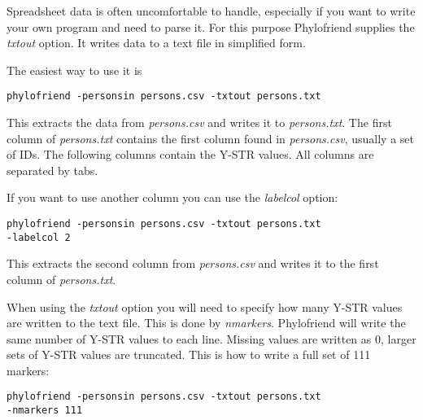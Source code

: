Spreadsheet data is often uncomfortable to handle, especially
if you want to write your own program and need to parse it.
For this purpose Phylofriend supplies the \emph{txtout}
option. It writes data to a text file in simplified form.

The easiest way to use it is

\vspace{1ex}
\noindent\texttt{phylofriend -personsin persons.csv -txtout persons.txt}
\vspace{1ex}

\noindent
This extracts the data from \emph{persons.csv} and writes
it to \emph{persons.txt}. The first column of \emph{persons.txt}
contains the first column found in \emph{persons.csv}, usually
a set of IDs. The following columns contain the Y-STR values.
All columns are separated by tabs.

If you want to use another column you can use the
\emph{labelcol} option:

\vspace{1ex}
\noindent\texttt{phylofriend -personsin persons.csv -txtout persons.txt\\
-labelcol 2}
\vspace{1ex}

\noindent
This extracts the second column from \emph{persons.csv} and
writes it to the first column of \emph{persons.txt}.

When using the \emph{txtout} option you will need to specify
how many Y-STR values are written to the text file. This is
done by \emph{nmarkers}. Phylofriend will write the same number
of Y-STR values to each line. Missing values are written as
0, larger sets of Y-STR values are truncated. This is how to
write a full set of 111 markers:

\vspace{1ex}
\noindent\texttt{phylofriend -personsin persons.csv -txtout persons.txt\\
-nmarkers 111}
















